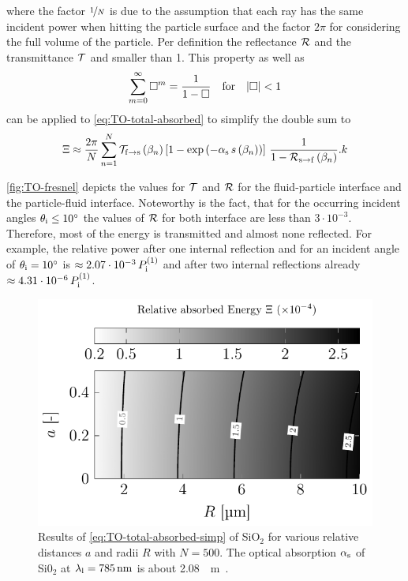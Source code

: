 where the factor $\nicefrac{1}{N}$ is due to the assumption that each ray has 
the same incident power when hitting the particle surface and the factor $2\pi$ 
for considering the full volume of the particle. Per definition the reflectance 
$\mathcal{R}$ and the transmittance $\mathcal{T}$ and smaller than 1. This property 
as well as
\begin{equation}
  \sum\limits^{\infty}_{m=0} \Box^{m} = \frac{1}{1-\Box}
  \quad\text{for}\quad\abs{\Box} < 1
\end{equation}
can be applied to \cref{eq:TO-total-absorbed} to simplify the double sum to
\begin{equation}
  \Xi \approx
  \frac{2\pi}{N}
  \sum\limits_{n=1}^{N}
  \mathcal{T}_{\mathrm{f}\rightarrow\mathrm{s}}\left( \beta_{n} \right)
  \left[ 1 - \exp\left( -\alpha_{\mathrm{s}}\,s\left( \beta_{n} \right) \right) 
  \right]
  \,\frac{1}{1-\mathcal{R}_{\mathrm{s}\rightarrow\mathrm{f}}\left( \beta_{n} \right)}.
  \label{eq:TO-total-absorbed-simp}k
\end{equation}

\cref{fig:TO-fresnel} depicts the values for $\mathcal{T}$ and $\mathcal{R}$ for 
the fluid-particle interface and the particle-fluid interface. Noteworthy is 
the fact, that for the occurring incident angles $\theta_{\mathrm{i}} \leq 
\SI{10}{\degree}$ the values of $\mathcal{R}$ for both interface are less than 
$3\cdot 10^{-3}$. Therefore, most of the energy is transmitted and almost none 
reflected. For example, the relative power after one internal reflection and 
for an incident angle of $\theta_{\mathrm{i}}=\SI{10}{\degree}$ is $\approx 2.07\cdot 
10^{-3}\,P_{\mathrm{i}}^{(1)}$ and after two internal reflections already $\approx 
4.31\cdot 10^{-6}\,P_{\mathrm{i}}^{(1)}$.

\begin{figure}[tbp]
  \centering
  \includegraphics[]{External/absorbed_energies.pdf}
  \caption{Results of \cref{eq:TO-total-absorbed-simp} of SiO$_{2}$ for various 
    relative distances $a$ and radii $R$ with $N=500$. The optical absorption 
    $\alpha_{\mathrm{s}}$ of Si0$_{2}$ at $\lal=\SI{785}{\nm}$ is about 
  \SI{2.08}{\per\meter}~\cite{Kitamura2007}.}
  \label{fig:TO-absorbed_energies}
\end{figure}

